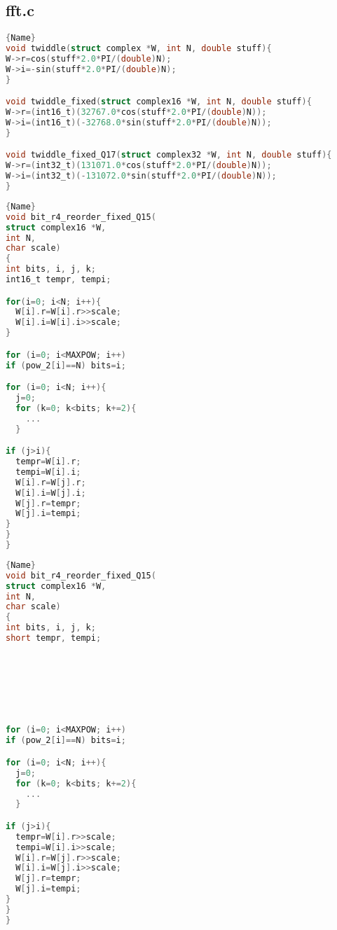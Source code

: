 \documentclass[a4paper]{article}
\begin{document}
\subsection{fft.c}
\begin{lstlisting}[caption=code 3,frame=tlrb, language=C]{Name}
void twiddle(struct complex *W, int N, double stuff){
W->r=cos(stuff*2.0*PI/(double)N);
W->i=-sin(stuff*2.0*PI/(double)N);
}

void twiddle_fixed(struct complex16 *W, int N, double stuff){
W->r=(int16_t)(32767.0*cos(stuff*2.0*PI/(double)N));
W->i=(int16_t)(-32768.0*sin(stuff*2.0*PI/(double)N));
}

void twiddle_fixed_Q17(struct complex32 *W, int N, double stuff){
W->r=(int32_t)(131071.0*cos(stuff*2.0*PI/(double)N));
W->i=(int32_t)(-131072.0*sin(stuff*2.0*PI/(double)N));
}
\end{lstlisting}

\noindent\begin{minipage}{.45\textwidth}
\begin{lstlisting}[caption=code 4,frame=tlrb, language=C]{Name}
void bit_r4_reorder_fixed_Q15(
struct complex16 *W, 
int N,
char scale)
{
int bits, i, j, k;
int16_t tempr, tempi;

for(i=0; i<N; i++){
  W[i].r=W[i].r>>scale;
  W[i].i=W[i].i>>scale;
}

for (i=0; i<MAXPOW; i++)
if (pow_2[i]==N) bits=i;

for (i=0; i<N; i++){
  j=0;
  for (k=0; k<bits; k+=2){
    ...
  }

if (j>i){
  tempr=W[i].r;
  tempi=W[i].i;
  W[i].r=W[j].r;
  W[i].i=W[j].i;
  W[j].r=tempr;
  W[j].i=tempi;
}
}
}
\end{lstlisting}
\end{minipage}\hfill
\begin{minipage}{.45\textwidth}
\begin{lstlisting}[caption=code 5,frame=tlrb, language=C]{Name}
void bit_r4_reorder_fixed_Q15(
struct complex16 *W, 
int N,
char scale)
{
int bits, i, j, k;
short tempr, tempi;







for (i=0; i<MAXPOW; i++)
if (pow_2[i]==N) bits=i;

for (i=0; i<N; i++){
  j=0;
  for (k=0; k<bits; k+=2){
    ...
  }

if (j>i){
  tempr=W[i].r>>scale;
  tempi=W[i].i>>scale;
  W[i].r=W[j].r>>scale;
  W[i].i=W[j].i>>scale;
  W[j].r=tempr;
  W[j].i=tempi;
}
}
}

\end{lstlisting}
\end{minipage}
\end{document}
